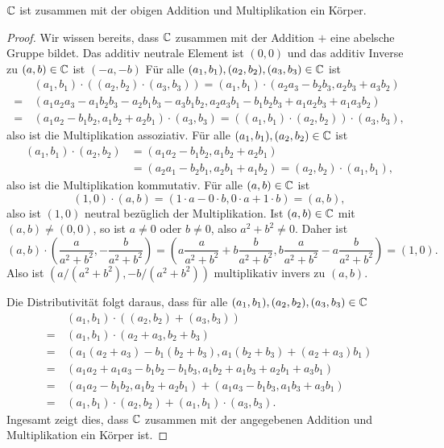 \begin{beh}
 $\mathbb{C}$ ist zusammen mit der obigen Addition und Multiplikation ein Körper.
\end{beh}
\begin{proof}
 Wir wissen bereits, dass $\mathbb{C}$ zusammen mit der Addition $+$ eine abelsche Gruppe bildet. Das additiv neutrale Element ist $(0,0)$ und das additiv Inverse zu $(a,b) \in \mathbb{C}$ ist $(-a,-b)$ Für alle $(a_1, b_1), (a_2, b_2), (a_3, b_3) \in \mathbb{C}$ ist
 \begin{align*}
   &\, (a_1, b_1) \cdot ((a_2, b_2) \cdot (a_3, b_3))
  = (a_1, b_1) \cdot (a_2 a_3 - b_2 b_3, a_2 b_3 + a_3 b_2) \\
  =&\, (a_1 a_2 a_3 - a_1 b_2 b_3 - a_2 b_1 b_3 - a_3 b_1 b_2, a_2 a_3 b_1 - b_1 b_2 b_3 + a_1 a_2 b_3 + a_1 a_3 b_2) \\
  =&\, (a_1 a_2 - b_1 b_2, a_1 b_2 + a_2 b_1) \cdot (a_3, b_3)
  = ((a_1, b_1) \cdot (a_2, b_2)) \cdot (a_3, b_3),
 \end{align*}
 also ist die Multiplikation assoziativ. Für alle $(a_1, b_1), (a_2, b_2) \in \mathbb{C}$ ist
 \begin{align*}
  (a_1, b_1) \cdot (a_2, b_2)
  &= (a_1 a_2 - b_1 b_2, a_1 b_2 + a_2 b_1) \\
  &= (a_2 a_1 - b_2 b_1, a_2 b_1 + a_1 b_2)
  = (a_2, b_2) \cdot (a_1, b_1),
 \end{align*}
 also ist die Multiplikation kommutativ. Für alle $(a,b) \in \mathbb{C}$ ist
 \[
  (1,0) \cdot (a,b) = (1 \cdot a - 0 \cdot b, 0 \cdot a + 1 \cdot b) = (a,b),
 \]
 also ist $(1,0)$ neutral bezüglich der Multiplikation. Ist $(a,b) \in \mathbb{C}$ mit $(a,b) \neq (0,0)$, so ist $a \neq 0$ oder $b \neq 0$, also $a^2+b^2 \neq 0$. Daher ist
 \[
  (a,b) \cdot \left(\frac{a}{a^2+b^2}, -\frac{b}{a^2+b^2}\right)
  = \left( a \frac{a}{a^2+b^2} + b \frac{b}{a^2+b^2}, b \frac{a}{a^2+b^2} - a \frac{b}{a^2+b^2} \right)
  = (1,0).
 \]
 Also ist $(a/(a^2+b^2), -b/(a^2+b^2))$ multiplikativ invers zu $(a,b)$.
 
 Die Distributivität folgt daraus, dass für alle $(a_1, b_1), (a_2, b_2), (a_3, b_3) \in \mathbb{C}$
 \begin{align*}
   &\, (a_1, b_1) \cdot ((a_2, b_2) + (a_3, b_3)) \\
  =&\,    (a_1, b_1) \cdot (a_2 + a_3, b_2 + b_3) \\
  =&\, (a_1 (a_2 + a_3) - b_1 (b_2 + b_3), a_1 (b_2 + b_3) + (a_2 + a_3) b_1) \\
  =&\, (a_1 a_2 + a_1 a_3 - b_1 b_2 - b_1 b_3, a_1 b_2 + a_1 b_3 + a_2 b_1 + a_3 b_1) \\
  =&\, (a_1 a_2 - b_1 b_2, a_1 b_2 + a_2 b_1) + (a_1 a_3 - b_1 b_3, a_1 b_3 + a_3 b_1) \\
  =&\, (a_1, b_1) \cdot (a_2, b_2) + (a_1, b_1) \cdot (a_3, b_3).
 \end{align*}
 Ingesamt zeigt dies, dass $\mathbb{C}$ zusammen mit der angegebenen Addition und Multiplikation ein Körper ist.
\end{proof}

